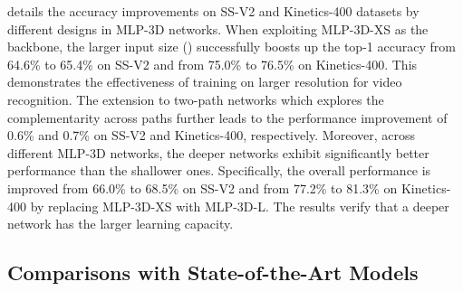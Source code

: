 \documentclass[10pt,twocolumn,letterpaper]{article}
\begin{document}
 details the accuracy improvements on SS-V2 and Kinetics-400 datasets by different designs in MLP-3D networks. When exploiting MLP-3D-XS as the backbone, the larger input size () successfully boosts up the top-1 accuracy from 64.6\% to 65.4\% on SS-V2 and from 75.0\% to 76.5\% on Kinetics-400. This demonstrates the effectiveness of training on larger resolution for video recognition. The extension to two-path networks which explores the complementarity across paths further leads to the performance improvement of 0.6\% and 0.7\% on SS-V2 and Kinetics-400, respectively. Moreover, across different MLP-3D networks, the deeper networks exhibit significantly better performance than the shallower ones. Specifically, the overall performance is improved from 66.0\% to 68.5\% on SS-V2 and from 77.2\% to 81.3\% on Kinetics-400 by replacing MLP-3D-XS with MLP-3D-L. The results verify that a deeper network has the larger learning capacity.

\subsection{Comparisons with State-of-the-Art Models}
\end{document}

